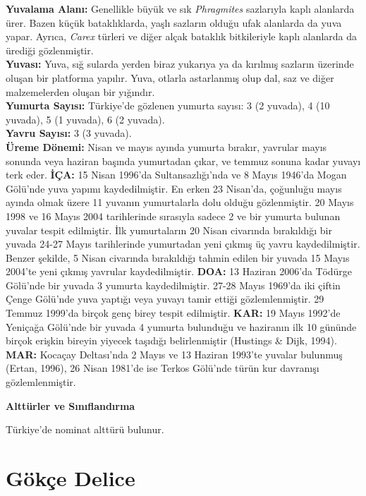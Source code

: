 \documentclass[
  a4paper,
  DIV=11,
  numbers=noendperiod]{scrreprt}
\begin{document}
\textbf{Yuvalama Alanı:} Genellikle büyük ve sık \emph{Phragmites}
sazlarıyla kaplı alanlarda ürer. Bazen küçük bataklıklarda, yaşlı
sazların olduğu ufak alanlarda da yuva yapar. Ayrıca, \emph{Carex}
türleri ve diğer alçak bataklık bitkileriyle kaplı alanlarda da ürediği
gözlenmiştir.\\
\textbf{Yuvası:} Yuva, sığ sularda yerden biraz yukarıya ya da kırılmış
sazların üzerinde oluşan bir platforma yapılır. Yuva, otlarla
astarlanmış olup dal, saz ve diğer malzemelerden oluşan bir yığındır.\\
\textbf{Yumurta Sayısı:} Türkiye'de gözlenen yumurta sayısı: 3 (2
yuvada), 4 (10 yuvada), 5 (1 yuvada), 6 (2 yuvada).\\
\textbf{Yavru Sayısı:} 3 (3 yuvada).\\
\textbf{Üreme Dönemi:} Nisan ve mayıs ayında yumurta bırakır, yavrular
mayıs sonunda veya haziran başında yumurtadan çıkar, ve temmuz sonuna
kadar yuvayı terk eder. \textbf{İÇA:} 15 Nisan 1996'da Sultansazlığı'nda
ve 8 Mayıs 1946'da Mogan Gölü'nde yuva yapımı kaydedilmiştir. En erken
23 Nisan'da, çoğunluğu mayıs ayında olmak üzere 11 yuvanın yumurtalarla
dolu olduğu gözlenmiştir. 20 Mayıs 1998 ve 16 Mayıs 2004 tarihlerinde
sırasıyla sadece 2 ve bir yumurta bulunan yuvalar tespit edilmiştir. İlk
yumurtaların 20 Nisan civarında bırakıldığı bir yuvada 24-27 Mayıs
tarihlerinde yumurtadan yeni çıkmış üç yavru kaydedilmiştir. Benzer
şekilde, 5 Nisan civarında bırakıldığı tahmin edilen bir yuvada 15 Mayıs
2004'te yeni çıkmış yavrular kaydedilmiştir. \textbf{DOA:} 13 Haziran
2006'da Tödürge Gölü'nde bir yuvada 3 yumurta kaydedilmiştir. 27-28
Mayıs 1969'da iki çiftin Çenge Gölü'nde yuva yaptığı veya yuvayı tamir
ettiği gözlemlenmiştir. 29 Temmuz 1999'da birçok genç birey tespit
edilmiştir. \textbf{KAR:} 19 Mayıs 1992'de Yeniçağa Gölü'nde bir yuvada
4 yumurta bulunduğu ve haziranın ilk 10 gününde birçok erişkin bireyin
yiyecek taşıdığı belirlenmiştir (Hustings \& Dijk, 1994). \textbf{MAR:}
Kocaçay Deltası'nda 2 Mayıs ve 13 Haziran 1993'te yuvalar bulunmuş
(Ertan, 1996), 26 Nisan 1981'de ise Terkos Gölü'nde türün kur davranışı
gözlemlenmiştir.

\textbf{Alttürler ve Sınıflandırma}

Türkiye'de nominat alttürü bulunur.

\section{Gökçe Delice}\label{guxf6kuxe7e-delice}
\end{document}
